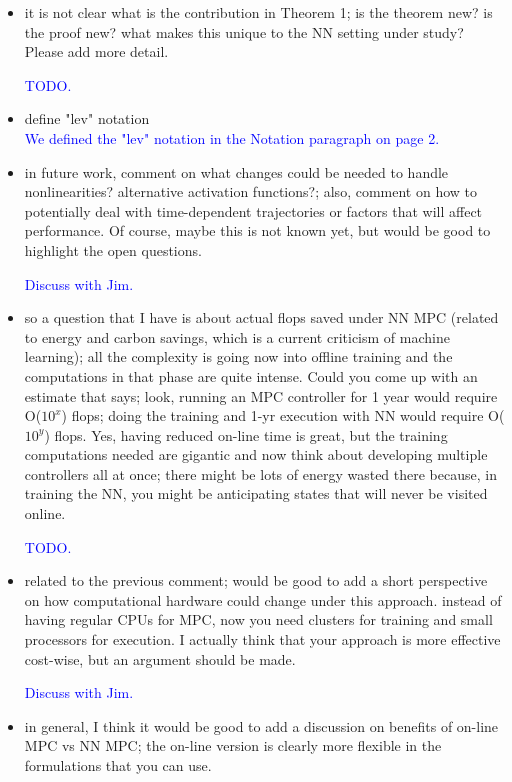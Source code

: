 \documentclass[xcolor=dvipsnames, 11pt]{article}
\newcommand{\reply}[1]{\textcolor{blue}{#1}}
\begin{document}
\begin{itemize}
  \item it is not clear what is the contribution in Theorem 1; is the theorem new? is the proof new? what makes this unique to the NN setting under study? Please add more detail.
  
  \reply{TODO.}

  \item define "lev" notation \\
  \reply{We defined the "lev" notation in the Notation paragraph on page 2.}

  \item in future work, comment on what changes could be needed to handle nonlinearities? alternative activation functions?; also, comment on how to potentially deal with time-dependent trajectories or factors that will affect performance. Of course, maybe this is not known yet, but would be good to highlight the open questions.

  \reply{Discuss with Jim.}

  \item so a question that I have is about actual flops saved under NN MPC (related to energy and carbon savings, which is a current criticism of machine learning); all the complexity is going now into offline training and the computations in that phase are quite intense. Could you come up with an estimate that says; look, running an MPC controller for 1 year would require O($10^x$) flops; doing the training and 1-yr execution with NN would require O($10^y$) flops.  Yes, having reduced on-line time is great, but the training computations needed are gigantic and now think about developing multiple controllers all at once; there might be lots of energy wasted there because, in training the NN, you might be anticipating states that will never be visited online.

  \reply{TODO.}

  \item related to the previous comment; would be good to add a short perspective on how computational hardware could change under this approach. instead of having regular CPUs for MPC, now you need clusters for training and small processors for execution. I actually think that your approach is more effective cost-wise, but an argument should be made.

  \reply{Discuss with Jim.}

  \item in general, I think it would be good to add a discussion on benefits of on-line MPC vs NN MPC; the on-line version is clearly more flexible in the formulations that you can use.


\end{itemize}
\end{document}
